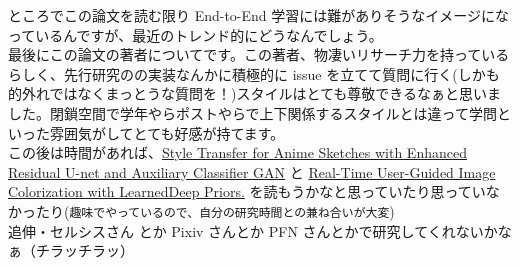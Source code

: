 \documentclass[a4paper, dvipdfmx, 10pt]{article}
\begin{document}
ところでこの論文を読む限り End-to-End 学習には難がありそうなイメージになっているんですが、最近のトレンド的にどうなんでしょう。\\

最後にこの論文の著者についてです。この著者、物凄いリサーチ力を持っているらしく、先行研究のの実装なんかに積極的に issue を立てて質問に行く(しかも的外れではなくまっとうな質問を！)スタイルはとても尊敬できるなぁと思いました。閉鎖空間で学年やらポストやらで上下関係するスタイルとは違って学問といった雰囲気がしてとても好感が持てます。\\

この後は時間があれば、\href{https://arxiv.org/pdf/1706.03319.pdf}{Style Transfer for Anime Sketches with Enhanced Residual U-net and Auxiliary Classifier GAN} と \href{https://arxiv.org/pdf/1705.02999.pdf}{Real-Time User-Guided Image Colorization with LearnedDeep Priors.} を読もうかなと思っていたり思っていなかったり(\texttt{趣味でやっているので、自分の研究時間との兼ね合いが大変})\\

追伸・セルシスさん とか Pixiv さんとか PFN さんとかで研究してくれないかなぁ（チラッチラッ）\\
\end{document}
